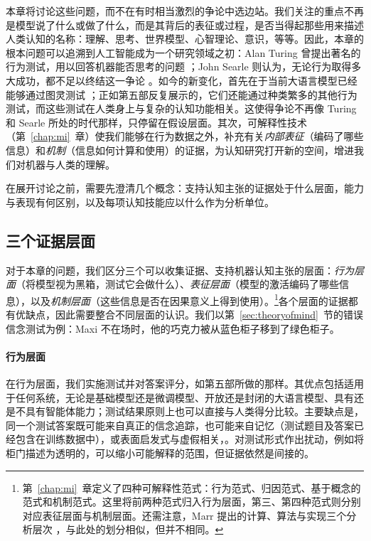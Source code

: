 本章将讨论这些问题，而不在有时相当激烈的争论中选边站。我们关注的重点不再是模型说了什么或做了什么，而是其背后的表征或过程，是否当得起那些用来描述人类认知的名称：理解、思考、世界模型、心智理论、意识，等等。因此，本章的根本问题可以追溯到人工智能成为一个研究领域之初：Alan Turing 曾提出著名的行为测试，用以回答机器能否思考的问题 \citep{turing1950computing}；John Searle 则认为，无论行为取得多大成功，都不足以终结这一争论 \citep{searle1980minds}。如今的新变化，首先在于当前大语言模型已经能够通过图灵测试 \citep{jones2025turing, gibney2025turing}；正如第五部反复展示的，它们还能通过种类繁多的其他行为测试，而这些测试在人类身上与复杂的认知功能相关。这使得争论不再像 Turing 和 Searle 所处的时代那样，只停留在假设层面。其次，可解释性技术（第~\ref{chap:mi}~章）使我们能够在行为数据之外，补充有关\emph{内部表征}（编码了哪些信息）和\emph{机制}（信息如何计算和使用）的证据，为认知研究打开新的空间，增进我们对机器与人类的理解。

在展开讨论之前，需要先澄清几个概念：支持认知主张的证据处于什么层面，能力与表现有何区别，以及每项认知技能应以什么作为分析单位。

\subsection{三个证据层面}\label{sec:levels}
对于本章的问题，我们区分三个可以收集证据、支持机器认知主张的层面：\emph{行为层面}（将模型视为黑箱，测试它会做什么）、\emph{表征层面}（模型的激活编码了哪些信息），以及\emph{机制层面}（这些信息是否在因果意义上得到使用）。\footnote{第~\ref{chap:mi}~章定义了四种可解释性范式：行为范式、归因范式、基于概念的范式和机制范式。这里将前两种范式归入行为层面，第三、第四种范式则分别对应表征层面与机制层面。还需注意，Marr 提出的计算、算法与实现三个分析层次 \citep{marr1982vision}，与此处的划分相似，但并不相同。}各个层面的证据都有优缺点，因此需要整合不同层面的认识。我们以第~\ref{sec:theoryofmind}~节的错误信念测试为例：Maxi 不在场时，他的巧克力被从蓝色柜子移到了绿色柜子。

\paragraph{行为层面} 在行为层面，我们实施测试并对答案评分，如第五部所做的那样。其优点包括适用于任何系统，无论是基础模型还是微调模型、开放还是封闭的大语言模型、具有还是不具有智能体能力；测试结果原则上也可以直接与人类得分比较。主要缺点是，同一个测试答案既可能来自真正的信念追踪，也可能来自记忆（测试题目及答案已经包含在训练数据中），或表面启发式与虚假相关，\citep[相关讨论见][]{hu2025reevaluatingtheorymindevaluation,kouwenhoven2026traces}。对测试形式作出扰动，例如将柜门描述为透明的，可以缩小可能解释的范围，但证据依然是间接的。

